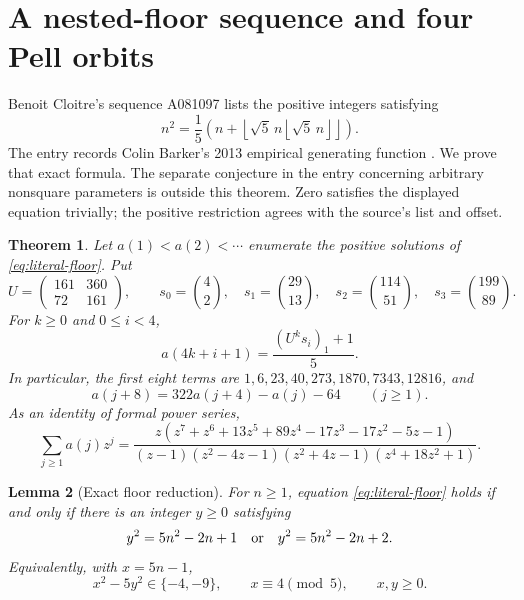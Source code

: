 \documentclass[11pt]{article}
\newtheorem{theorem}{Theorem}[section]
\newtheorem{lemma}[theorem]{Lemma}
\begin{document}
\section{A nested-floor sequence and four Pell orbits}\label{sec:pell}

Benoit Cloitre's sequence A081097 lists the positive integers satisfying
\begin{equation}\label{eq:literal-floor}
 n^2=\frac15\left(n+
 \left\lfloor\sqrt5\,n\left\lfloor\sqrt5\,n\right\rfloor\right\rfloor\right).
\end{equation}
The entry records Colin Barker's 2013 empirical generating function
\cite{oeis081097}. We prove that exact formula. The separate conjecture
in the entry concerning arbitrary nonsquare parameters is outside this theorem.
Zero satisfies the displayed equation trivially; the positive restriction
agrees with the source's list and offset.

\begin{theorem}\label{thm:pell-main}
Let $a(1)<a(2)<\cdots$ enumerate the positive solutions of
\eqref{eq:literal-floor}. Put
\[
 U=\begin{pmatrix}161&360\\72&161\end{pmatrix},\qquad
 s_0=\binom42,\quad s_1=\binom{29}{13},\quad
 s_2=\binom{114}{51},\quad s_3=\binom{199}{89}.
\]
For $k\ge0$ and $0\le i<4$,
\[
 a(4k+i+1)=\frac{(U^ks_i)_1+1}{5}.
\]
In particular, the first eight terms are
$1,6,23,40,273,1870,7343,12816$, and
\begin{equation}\label{eq:pell-recurrence}
 a(j+8)=322a(j+4)-a(j)-64\qquad(j\ge1).
\end{equation}
As an identity of formal power series,
\begin{equation}\label{eq:pell-gf}
\sum_{j\ge1}a(j)z^j=
\frac{z(z^7+z^6+13z^5+89z^4-17z^3-17z^2-5z-1)}
{(z-1)(z^2-4z-1)(z^2+4z-1)(z^4+18z^2+1)}.
\end{equation}
\end{theorem}

\begin{lemma}[Exact floor reduction]\label{lem:floor-bridge}
For $n\ge1$, equation \eqref{eq:literal-floor} holds if and only if
there is an integer $y\ge0$ satisfying
\[
 y^2=5n^2-2n+1\quad\hbox{or}\quad y^2=5n^2-2n+2.
\]
Equivalently, with $x=5n-1$,
\begin{equation}\label{eq:pell-admissible}
 x^2-5y^2\in\{-4,-9\},\qquad x\equiv4\pmod5,\qquad x,y\ge0.
\end{equation}
\end{lemma}
\end{document}
